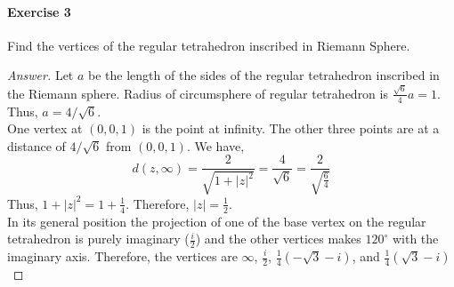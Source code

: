 \paragraph{Exercise 3} Find the vertices of the regular tetrahedron inscribed in Riemann Sphere.
	\begin{proof}[Answer]
		Let $a$ be the length of the sides of the regular tetrahedron inscribed in the Riemann sphere.
		Radius of circumsphere of regular tetrahedron is $\frac{\sqrt{6}}{4}a = 1$.
		Thus, $a = 4/\sqrt{6}$.\\

		One vertex at $(0,0,1)$ is the point at infinity.
		The other three points are at a distance of $4/\sqrt{6}$ from $(0,0,1)$.
		We have, 
		\[d(z,\infty) = \frac{2}{\sqrt{1+|z|^2}} = \frac{4}{\sqrt{6}} = \frac{2}{\sqrt{\frac{6}{4}}} \]
		Thus, $1+|z|^2 = 1+\frac{1}{4}$.
		Therefore, $|z| = \frac{1}{2}$.\\

		In its general position the projection of one of the base vertex on the regular tetrahedron is purely imaginary ($\frac{i}{2}$) and the other vertices makes $120^\circ$ with the imaginary axis.
		Therefore, the vertices are $\infty$, $\frac{i}{2}$, $\frac{1}{4}\left(-\sqrt{3}-i\right)$, and $\frac{1}{4}\left(\sqrt{3}-i\right)$
		\end{proof}
